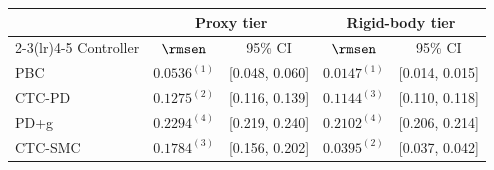 \begin{tabular}{lcccc}
\toprule
& \multicolumn{2}{c}{Proxy tier} & \multicolumn{2}{c}{Rigid-body tier} \\
\cmidrule(lr){2-3}\cmidrule(lr){4-5}
Controller & $\rmsen$ & 95\% CI & $\rmsen$ & 95\% CI \\
\midrule
PBC     & $0.0536^{(1)}$ & [0.048, 0.060] & $0.0147^{(1)}$ & [0.014, 0.015] \\
CTC-PD  & $0.1275^{(2)}$ & [0.116, 0.139] & $0.1144^{(3)}$ & [0.110, 0.118] \\
PD+g    & $0.2294^{(4)}$ & [0.219, 0.240] & $0.2102^{(4)}$ & [0.206, 0.214] \\
CTC-SMC & $0.1784^{(3)}$ & [0.156, 0.202] & $0.0395^{(2)}$ & [0.037, 0.042] \\
\bottomrule
\end{tabular}
